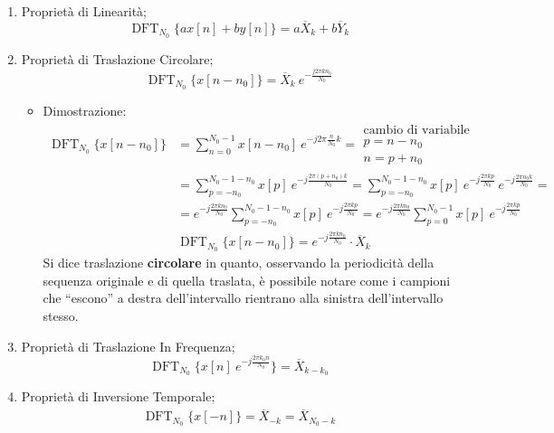 \documentclass[
]{article}
\providecommand{\tightlist}{%
  \setlength{\itemsep}{0pt}\setlength{\parskip}{0pt}}
\begin{document}
\begin{enumerate}
\def\labelenumi{\arabic{enumi}.}
\setcounter{enumi}{15}
\item
  Proprietà di Linearità; \[
  \operatorname{DFT}_{N_0}\Big\{ax[n]+by[n]\Big\} = a\overline{X}_k + b\overline{Y}_k
  \]
\item
  Proprietà di Traslazione Circolare; \[
  \operatorname{DFT}_{N_0}\Big\{ x[n-n_0] \Big\} = \overline{X}_k \ e^{-\frac{j2\pi kn_0}{N_0}}
  \]

  \begin{itemize}
  \tightlist
  \item
    Dimostrazione: \begin{align*}
    \operatorname{DFT}_{N_0}\Big\{ x[n-n_0] \Big\} &= \sum_{n=0}^{N_0 -1} x[n-n_0] \ e^{-j2\pi\frac{n}{N_0}k} =
    \boxed{
    \begin{array}{cl}
    \text{cambio di variabile} \\
    p  = n - n_0 \\
    n  = p + n_0
    \end{array}} \\
    &= \sum_{p=-n_0}^{N_0 - 1 - n_0} x[p] \ e^{-j\frac{2\pi(p+n_0)k}{N_0}} = \sum_{p=-n_0}^{N_0 - 1 - n_0} x[p] \ e^{-j\frac{2\pi kp}{N_0}} \ e^{-j\frac{2\pi n_{0}k}{N_0}}=\\
    &= e^{-j\frac{2\pi kn_0}{N_0}} \sum_{p=-n_0}^{N_0 - 1 - n_0} x[p] \ e^{-j\frac{2\pi kp}{N_0}} = e^{-j\frac{2\pi kn_0}{N_0}} \sum_{p=0}^{N_0 - 1} x[p] \ e^{-j\frac{2\pi kp}{N_0}} \\
    &\operatorname{DFT}_{N_0}\Big\{ x[n-n_0] \Big\} = e^{-j\frac{2\pi kn_0}{N_0}} \cdot \overline{X}_k &
    \end{align*} Si dice traslazione \textbf{circolare} in quanto,
    osservando la periodicità della sequenza originale e di quella
    traslata, è possibile notare come i campioni che ``escono'' a destra
    dell'intervallo rientrano alla sinistra dell'intervallo stesso.
  \end{itemize}
\item
  Proprietà di Traslazione In Frequenza; \[
  \operatorname{DFT}_{N_0}\Big\{ x[n] \ e^{-j\frac{2\pi k_0 n}{N_0}} \Big\} = \overline{X}_{k-k_0}
  \]
\item
  Proprietà di Inversione Temporale; \begin{gather*}
  \operatorname{DFT}_{N_0}\Big\{ x[-n] \Big\} = \overline{X}_{-k} = \overline{X}_{N_0 - k} 
  \end{gather*}


\end{enumerate}
\end{document}

